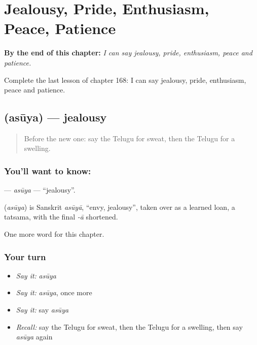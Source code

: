 
\chapter{Jealousy, Pride, Enthusiasm, Peace, Patience}
\label{ch:te-jealousy-pride-enthusiasm-peace-patience}

\begin{chapteropening}
\textbf{By the end of this chapter:} \emph{I can say jealousy, pride, enthusiasm, peace and patience.}

Complete the last lesson of chapter 168: I can say jealousy, pride, enthusiasm, peace and patience.
\end{chapteropening}

\section[\texorpdfstring{\te{అసూయ} (asūya)}{అసూయ (asūya)}]{ (asūya) — jealousy}

\label{lesson:TE-C168-asuya}



\begin{quote}
Before the new one: say the Telugu for sweat, then the Telugu for a swelling.
\end{quote}

\subsection*{You'll want to know: }
\textbf{} — \emph{asūya} — \textquotedblleft{}jealousy\textquotedblright{}.

\begin{cousinweb}
\textbf{} (\emph{asūya}) is Sanskrit \emph{asūyā}, \textquotedblleft{}envy, jealousy\textquotedblright{}, taken over as a learned loan, a tatsama, with the final \emph{-ā} shortened.
\end{cousinweb}

\begin{grammarlens}[title={What you've built}]
One more word for this chapter.
\end{grammarlens}

\subsection*{Your turn}
\begin{itemize}
\raggedright
  \item \emph{Say it:} \emph{asūya}
  \item \emph{Say it:} \emph{asūya}, once more
  \item \emph{Say it:} say \emph{asūya}
  \item \emph{Recall:} say the Telugu for sweat, then the Telugu for a swelling, then say \emph{asūya} again
\end{itemize}

